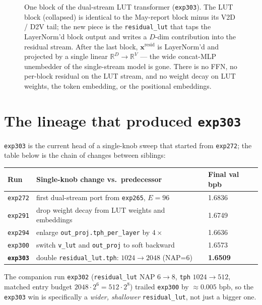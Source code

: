 \documentclass[11pt]{article}
\begin{document}
\begin{figure}[!ht]
\caption{One block of the dual-stream LUT transformer (\texttt{exp303}). The LUT block (collapsed) is identical to the May-report block minus its V2D / D2V tail; the new piece is the \texttt{residual\_lut} that taps the LayerNorm'd block output and writes a $D$-dim contribution into the residual stream. After the last block, $\mathbf{x}^{\text{resid}}$ is LayerNorm'd and projected by a single linear $\mathbb{R}^D \to \mathbb{R}^V$ --- the wide concat-MLP unembedder of the single-stream model is gone. There is no FFN, no per-block residual on the LUT stream, and no weight decay on LUT weights, the token embedding, or the positional embeddings.}
\label{fig:block}
\end{figure}

\section{The lineage that produced \texttt{exp303}}
\label{sec:why}

\texttt{exp303} is the current head of a single-knob sweep that started from \texttt{exp272}; the table below is the chain of changes between siblings:
\begin{center}\small
\begin{tabular}{lll}
\toprule
Run & Single-knob change vs.\ predecessor & Final val bpb \\
\midrule
\texttt{exp272} & first dual-stream port from \texttt{exp265}, $E = 96$ & 1.6836 \\
\texttt{exp291} & drop weight decay from LUT weights and embeddings & 1.6749 \\
\texttt{exp294} & enlarge \texttt{out\_proj.tph\_per\_layer} by $4\times$ & 1.6636 \\
\texttt{exp300} & switch \texttt{v\_lut} and \texttt{out\_proj} to soft backward & 1.6573 \\
\textbf{\texttt{exp303}} & double \texttt{residual\_lut.tph}: $1024 \to 2048$ (NAP=6) & \textbf{1.6509} \\
\bottomrule
\end{tabular}
\end{center}
The companion run \texttt{exp302} (\texttt{residual\_lut} NAP $6 \to 8$, \texttt{tph} $1024 \to 512$, matched entry budget $2048 \cdot 2^{6} = 512 \cdot 2^{8}$) trailed \texttt{exp300} by $\approx 0.005$ bpb, so the \texttt{exp303} win is specifically a \emph{wider, shallower} \texttt{residual\_lut}, not just a bigger one.
\end{document}
